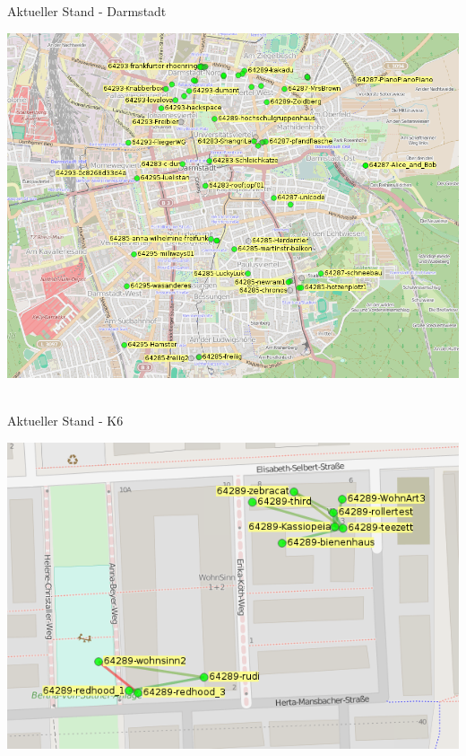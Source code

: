 \documentclass{beamer}
\begin{document}
\begin{frame}{Aktueller Stand - Darmstadt}
\vfill
\begin{center}
\includegraphics[height=0.75\textheight]{images/2015-01-26-darmstadt}$\;$
\vfill
\end{center}
\end{frame}

\begin{frame}{Aktueller Stand - K6}
\vfill
\begin{center}
\includegraphics[height=0.75\textheight]{images/2015-01-26-wohnart3}$\;$
\vfill
\end{center}
\end{frame}
\end{document}
